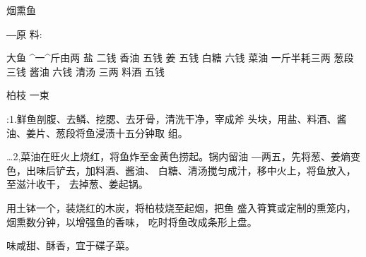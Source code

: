 \begin{recipe}{烟熏鱼}

―原 料:

大鱼	^一^斤由两	盐	二钱
香油	五钱	姜	五钱
白糖	六钱	菜油	一斤半耗三两
葱段	三钱	酱油	六钱
清汤	三两	料酒	五钱

柏枝	一束

\cooking

:1.鲜鱼剖腹、去鳞、挖腮、去牙骨，清洗干净，宰成斧 头块，用盐、料酒、酱油、姜片、葱段将鱼浸渍十五分钟取 组。

…2,菜油在旺火上烧红，将鱼炸至金黄色捞起。锅内留油 ―两五，先将葱、姜熵变色，出味后铲去，加料酒、酱油、 白糖、清汤搅匀成汁，移中火上，将鱼放入，至滋汁收干， 去掉葱、姜起锅。

\step 用土钵一个，装烧红的木炭，将柏枝烧至起烟，把鱼 盛入筲箕或定制的熏笼内，烟熏数分钟，以增强鱼的香味， 吃时将鱼改成条形上盘。

\notes

味咸甜、酥香，宜于碟子菜。

\end{recipe}

